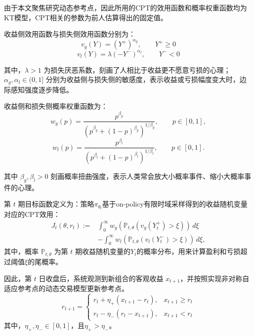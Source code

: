 由于本文聚焦研究动态参考点，因此所用的CPT的效用函数和概率权重函数均为KT模型，CPT相关的参数为前人估算得出的固定值\citep{kahneman1979prospect}。

收益侧效用函数与损失侧效用函数分别为：
\begin{equation}
v_g(Y)
=(Y^+)^{\alpha_g},
\qquad
Y^+\ge 0
\end{equation}
\begin{equation}
v_l(Y)
=\lambda (-Y^-)^{\alpha_l},  
\qquad
Y^-<0
\end{equation}

其中，$\lambda>1$ 为损失厌恶系数，刻画了人相比于收益更不愿意亏损的心理；$\alpha_g,\alpha_l\in(0,1]$ 分别为收益侧与损失侧的敏感度，表示收益或亏损幅度变大时，边际感知强度逐步降低。

收益侧和损失侧概率权重函数为：
\begin{equation}
 w_g(p)=\frac{p^{\beta_g}}{\left(p^{\beta_g}+(1-p)^{\beta_g}\right)^{1/\beta_g}},\qquad p\in[0,1],
\end{equation}
\begin{equation}
 w_l(p)=\frac{p^{\beta_l}}{\left(p^{\beta_l}+(1-p)^{\beta_l}\right)^{1/\beta_l}},\qquad p\in[0,1].
\end{equation}

其中 $\beta_g,\beta_l>0$ 刻画概率扭曲强度，表示人类常会放大小概率事件、缩小大概率事件的心理。


第 $t$ 期目标函数定义为：策略$\pi_{\theta_t}$基于on-policy有限时域采样得到的收益随机变量对应的CPT效用：
\begin{equation}
\label{eq:cpt_objective}
\begin{aligned}
J_t(\theta,r_t)
:=&\int_0^\infty w_g\!\left(\mathbb{P}_{t,\theta}\left(v_g(Y_t^+)>\xi\right)\right)\,d\xi \\
&-\int_0^\infty  w_l\!\left(\mathbb{P}_{t,\theta}\left(v_l(Y_t^-)>\xi\right)\right)\,d\xi,
\end{aligned}
\end{equation}
其中，概率 $\mathbb{P}_{t,\theta}$ 为第 $t$ 期收益随机变量的$Y_t$的概率分布，用来计算盈利和亏损超过阈值$\xi$的尾概率。

因此，第 $t$ 日收盘后，系统观测到新组合的客观收益 $x_{t+1}$，并按照实现非对称自适应参考点的动态交易模型更新参考点\citep{he2019realization}。
\begin{equation}
\label{eq:reference_update}
r_{t+1}
=
\begin{cases}
r_t+\eta_+\left(x_{t+1}-r_t\right), & x_{t+1}\ge r_t\\[4pt]
r_t-\eta_-\left(r_t-x_{t+1}\right), & x_{t+1}<r_t
\end{cases}
\end{equation}
其中，$\eta_+,\eta_-\in[0,1]$，且$\eta_+ >\eta_-$。


